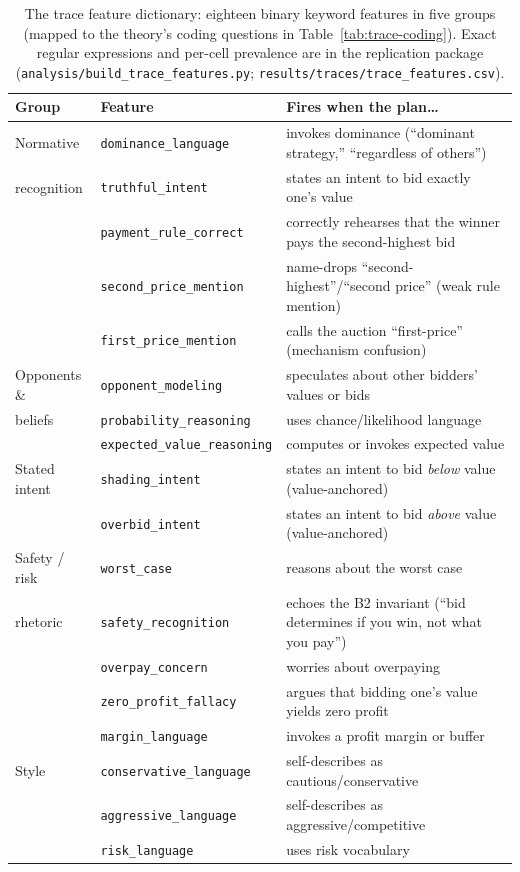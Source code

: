 \begin{table}[htbp]
\centering
\footnotesize
\setlength{\tabcolsep}{5pt}
\begin{tabular}{llp{8.2cm}}
\toprule
Group & Feature & Fires when the plan\ldots \\
\midrule
Normative & \texttt{dominance\_language} & invokes dominance (``dominant strategy,'' ``regardless of others'') \\
recognition & \texttt{truthful\_intent} & states an intent to bid exactly one's value \\
& \texttt{payment\_rule\_correct} & correctly rehearses that the winner pays the second-highest bid \\
& \texttt{second\_price\_mention} & name-drops ``second-highest''/``second price'' (weak rule mention) \\
& \texttt{first\_price\_mention} & calls the auction ``first-price'' (mechanism confusion) \\
\addlinespace
Opponents \& & \texttt{opponent\_modeling} & speculates about other bidders' values or bids \\
beliefs & \texttt{probability\_reasoning} & uses chance/likelihood language \\
& \texttt{expected\_value\_reasoning} & computes or invokes expected value \\
\addlinespace
Stated intent & \texttt{shading\_intent} & states an intent to bid \emph{below} value (value-anchored) \\
& \texttt{overbid\_intent} & states an intent to bid \emph{above} value (value-anchored) \\
\addlinespace
Safety / risk & \texttt{worst\_case} & reasons about the worst case \\
rhetoric & \texttt{safety\_recognition} & echoes the B2 invariant (``bid determines if you win, not what you pay'') \\
& \texttt{overpay\_concern} & worries about overpaying \\
& \texttt{zero\_profit\_fallacy} & argues that bidding one's value yields zero profit \\
& \texttt{margin\_language} & invokes a profit margin or buffer \\
\addlinespace
Style & \texttt{conservative\_language} & self-describes as cautious/conservative \\
& \texttt{aggressive\_language} & self-describes as aggressive/competitive \\
& \texttt{risk\_language} & uses risk vocabulary \\
\bottomrule
\end{tabular}
\caption{The trace feature dictionary: eighteen binary keyword features in five groups (mapped to the theory's coding questions in Table~\ref{tab:trace-coding}). Exact regular expressions and per-cell prevalence are in the replication package (\texttt{analysis/build\_trace\_features.py}; \texttt{results/traces/trace\_features.csv}).}
\label{tab:trace-dictionary}
\end{table}


